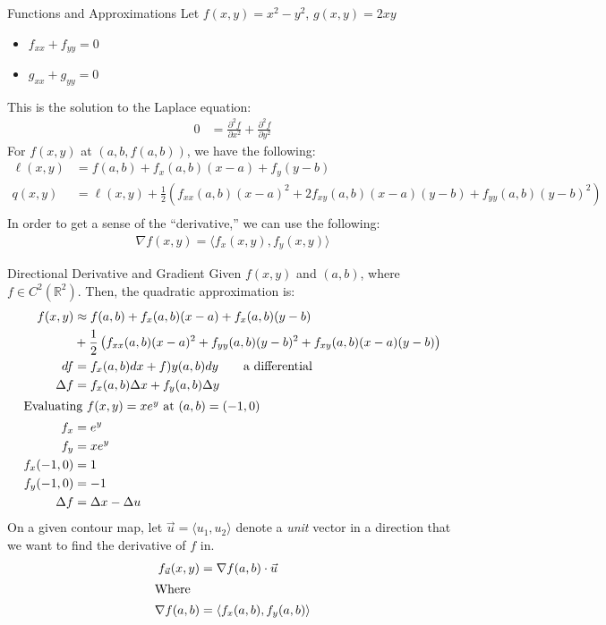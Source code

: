 \documentclass[8pt]{extarticle}
\begin{document}
  \begin{problem}{Functions and Approximations}
    Let $f(x,y) = x^2 - y^2$, $g(x,y) = 2xy$
    \begin{itemize}
      \item $f_{xx} + f_{yy} = 0$
      \item $g_{xx} + g_{yy} = 0$
    \end{itemize}
    This is the solution to the Laplace equation:
    \begin{align*}
      0 &= \frac{\partial^2 f}{\partial x^2} + \frac{\partial^2 f}{\partial y^2}
    \end{align*}
    For $f(x,y)$ at $(a,b,f(a,b))$, we have the following:
    \begin{align*}
      \ell(x,y) &= f(a,b) + f_x(a,b)(x-a) + f_y(y-b)\\
      q(x,y) &= \ell(x,y) + \frac{1}{2}\left(f_{xx}(a,b)(x-a)^2 + 2f_{xy}(a,b)(x-a)(y-b) + f_{yy}(a,b)(y-b)^2\right)\\
    \end{align*}
    In order to get a sense of the ``derivative,'' we can use the following:
    \begin{align*}
      \nabla f(x,y) = \langle f_x(x,y),f_y(x,y)\rangle
    \end{align*}
  \end{problem}
  \begin{problem}{Directional Derivative and Gradient}
    Given $f(x,y)$ and $(a,b)$, where $f\in C^{2}(\mathbb{R}^2)$. Then, the quadratic approximation is:
    \begin{align*}
      f(x,y) &\approx f(a,b) + f_{x}(a,b)(x-a) + f_x(a,b)(y-b)\\
             &+ \frac{1}{2}\left(f_{xx}(a,b)(x-a)^2 + f_{yy}(a,b)(y-b)^2 + f_{xy}(a,b)(x-a)(y-b)\right)\\
          df &= f_x(a,b)dx + f)y(a,b)dy \tag*{a differential}\\
      \Delta f &= f_x(a,b)\Delta x + f_y(a,b)\Delta y\\
      \shortintertext{Evaluating $f(x,y) = xe^y$ at $(a,b) = (-1,0)$}
      f_x &= e^y\\
      f_y &= xe^y\\
      f_x(-1,0) &= 1\\
      f_y(-1,0) &= -1\\
      \Delta f &= \Delta x - \Delta u
    \end{align*}
    On a given contour map, let $\vec u = \langle u_1,u_2\rangle$ denote a \textit{unit} vector in a direction that we want to find the derivative of $f$ in.
    \begin{align*}
      f_{\vec u}(x,y) &= \nabla f(a,b) \cdot \vec u\\
      \shortintertext{Where}
      \nabla f(a,b) &= \langle f_x(a,b),f_y(a,b)\rangle
    \end{align*}
  \end{problem}
\end{document}
